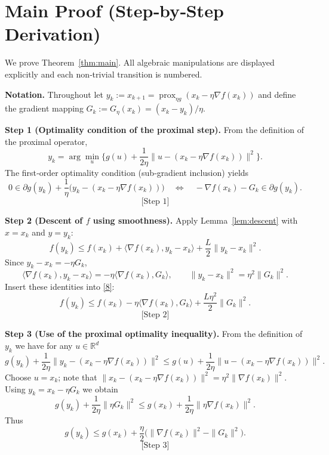 \documentclass{article}
\newcommand{\prox}{\operatorname{prox}}
\newcommand{\grad}{\nabla}
\newcommand{\R}{\mathbb{R}}
\begin{document}
\section*{Main Proof (Step‑by‑Step Derivation)}
We prove Theorem~\ref{thm:main}.  All algebraic manipulations are displayed explicitly and each non‑trivial transition is numbered.

\bigskip
\noindent\textbf{Notation.}  Throughout let $y_{k}:=x_{k+1}= \prox_{\eta g}(x_{k}-\eta\grad f(x_{k}))$ and define the gradient mapping $G_{k}:=G_{\eta}(x_{k})=(x_{k}-y_{k})/\eta$.

\bigskip
\noindent\textbf{Step 1 (Optimality condition of the proximal step).}  
From the definition of the proximal operator,
\[
y_{k}= \arg\min_{u}\Big\{ g(u)+\frac{1}{2\eta}\|u-(x_{k}-\eta\grad f(x_{k}))\|^{2}\Big\}.
\]
The first‑order optimality condition (sub‑gradient inclusion) yields
\[
0\in \partial g(y_{k})+\frac{1}{\eta}\bigl(y_{k}-(x_{k}-\eta\grad f(x_{k}))\bigr)
\quad\Longleftrightarrow\quad
-\grad f(x_{k})-G_{k}\in\partial g(y_{k}). \tag{7}
\] 
\[
\text{[Step 1]}
\]

\noindent\textbf{Step 2 (Descent of $f$ using smoothness).}  
Apply Lemma~\ref{lem:descent} with $x=x_{k}$ and $y=y_{k}$:
\[
f(y_{k})\le f(x_{k})+\langle\grad f(x_{k}),y_{k}-x_{k}\rangle+\frac{L}{2}\|y_{k}-x_{k}\|^{2}.
\tag{8}
\] 
Since $y_{k}-x_{k}=-\eta G_{k}$,
\[
\langle\grad f(x_{k}),y_{k}-x_{k}\rangle
= -\eta\langle\grad f(x_{k}),G_{k}\rangle,
\qquad
\|y_{k}-x_{k}\|^{2}= \eta^{2}\|G_{k}\|^{2}.
\] 
Insert these identities into \eqref{8}:
\[
f(y_{k})\le f(x_{k})-\eta\langle\grad f(x_{k}),G_{k}\rangle+\frac{L\eta^{2}}{2}\|G_{k}\|^{2}.
\tag{9}
\] 
\[
\text{[Step 2]}
\]

\noindent\textbf{Step 3 (Use of the proximal optimality inequality).}  
From the definition of $y_{k}$ we have for any $u\in\R^{d}$
\[
g(y_{k})+\frac{1}{2\eta}\|y_{k}-(x_{k}-\eta\grad f(x_{k}))\|^{2}
\le g(u)+\frac{1}{2\eta}\|u-(x_{k}-\eta\grad f(x_{k}))\|^{2}.
\tag{10}
\] 
Choose $u = x_{k}$; note that $\|x_{k}-(x_{k}-\eta\grad f(x_{k}))\|^{2}= \eta^{2}\|\grad f(x_{k})\|^{2}$.  Using $y_{k}=x_{k}-\eta G_{k}$ we obtain
\[
g(y_{k})+\frac{1}{2\eta}\|\eta G_{k}\|^{2}
\le g(x_{k})+\frac{1}{2\eta}\|\eta\grad f(x_{k})\|^{2}.
\] 
Thus
\[
g(y_{k})\le g(x_{k})+\frac{\eta}{2}\bigl(\|\grad f(x_{k})\|^{2}-\|G_{k}\|^{2}\bigr).
\tag{11}
\] 
\[
\text{[Step 3]}
\]
\end{document}
